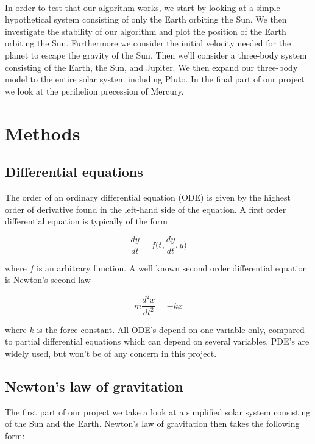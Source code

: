 \documentclass[a4paper, fontsize=11pt]{article}
\begin{document}
\paragraph{}
In order to test that our algorithm works, we start by looking at a simple hypothetical system consisting of only the Earth orbiting the Sun. We then investigate the stability of our algorithm and plot the position of the Earth orbiting the Sun. Furthermore we consider the initial velocity needed for the planet to escape the gravity of the Sun. Then we'll consider a three-body system consisting of the Earth, the Sun, and Jupiter. We then expand our three-body model to the entire solar system including Pluto. In the final part of our project we look at the perihelion precession of Mercury.



\section{Methods}


\subsection{Differential equations}
The order of an ordinary differential equation (ODE) is given by the highest order of derivative found in the left-hand side of the equation. A first order differential equation is typically of the form 

\begin{equation}
\dfrac{dy}{dt} = f\big(t,\dfrac{dy}{dt},y\big)
\end{equation}

where $f$ is an arbitrary function. A well known second order differential equation is Newton's second law 

\begin{equation}
m \dfrac{d^2 x}{dt^2}=-kx
\end{equation}

where $k$ is the force constant. All ODE's depend on one variable only, compared to partial differential equations which can depend on several variables. PDE's are widely used, but won't be of any concern in this project.


\subsection{Newton's law of gravitation}
The first part of our project we take a look at a simplified solar system consisting of the Sun and the Earth. Newton's law of gravitation then takes the following form:
\end{document}
